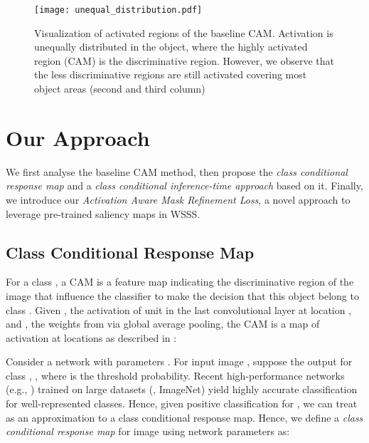 \documentclass[10pt,twocolumn,letterpaper]{article}
\begin{document}
\begin{figure}[t!]
   \begin{center}
   {\texttt{[image: unequal\_distribution.pdf]}}
   \end{center}
\vspace{-2mm}
\caption{Visualization of activated regions of the baseline CAM. 
Activation is unequally distributed in the object, where the highly activated region (CAM) is the discriminative region.
However, we observe that the
less discriminative regions are still activated covering most object areas (second and third column)}
\vspace{-4mm}
   \label{fig: unequal distribution}
\end{figure}

\section{Our Approach}
We first analyse the baseline CAM method, then propose the \emph{class conditional response map} and a
\emph{class conditional inference-time approach} 
based on it. Finally, we introduce our \emph{Activation Aware Mask Refinement Loss}, a novel approach to leverage pre-trained saliency maps in WSSS.



\subsection{Class Conditional Response Map}
\label{sec: Class Conditional Response Map}
For a class , a CAM \cite{zhou2016learning} is a feature map indicating the discriminative region of the image that influence the classifier to make the decision that this object belong to class .
Given , the activation of unit  in the last convolutional layer at location , and , the weights from   
via global average pooling, the CAM  is a map of activation at locations  as described in \cite{zhou2016learning}:



Consider a network  with parameters .
For input image , suppose the output for class , , where  is the threshold probability. Recent high-performance networks  (e.g., \cite{huang2017densely,He_2016_CVPR}) trained on large datasets (\eg, ImageNet) yield highly accurate classification for well-represented classes.
Hence, given positive classification for , we can treat  as an approximation to a class conditional response map.
Hence, we define a \emph{class conditional response map} for image  using network parameters  as:
\end{document}
